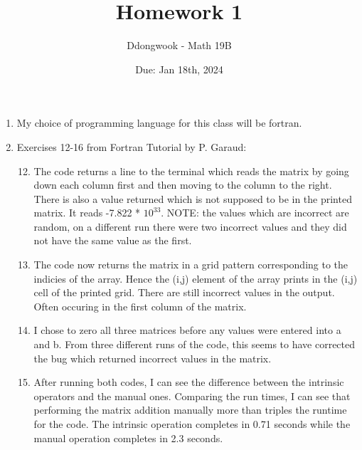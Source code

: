 \documentclass[11pt]{article}
\title{Homework 1}
\author{Ddongwook - Math 19B}
\date{Due: Jan 18th, 2024}
\begin{document}
\maketitle

\noindent 
\normalsize

\begin{enumerate}
\item 
My choice of programming language for this class will be fortran. 

\item 
Exercises 12-16 from Fortran Tutorial by P. Garaud:
\begin{enumerate}
    \setcounter{enumii}{11}
    \item The code returns a line to the terminal which reads the matrix by going down each column first and then moving to the column to the right. There is also a value returned which is not supposed to be in the printed matrix. It reads -7.822 * $10^{33}$. NOTE: the values which are incorrect are random, on a different run there were two incorrect values and they did not have the same value as the first. 

    \item The code now returns the matrix in a grid pattern corresponding to the indicies of the array. Hence the (i,j) element of the array prints in the (i,j) cell of the printed grid. There are still incorrect values in the output. Often occuring in the first column of the matrix.  

    \item I chose to zero all three matrices before any values were entered into a and b. From three different runs of the code, this seems to have corrected the bug which returned incorrect values in the matrix. 

    \item After running both codes, I can see the difference between the intrinsic operators and the manual ones. Comparing the run times, I can see that performing the matrix addition manually more than triples the runtime for the code. The intrinsic operation completes in 0.71 seconds while the manual operation completes in 2.3 seconds. 


\end{enumerate}
\end{enumerate}
\end{document}
